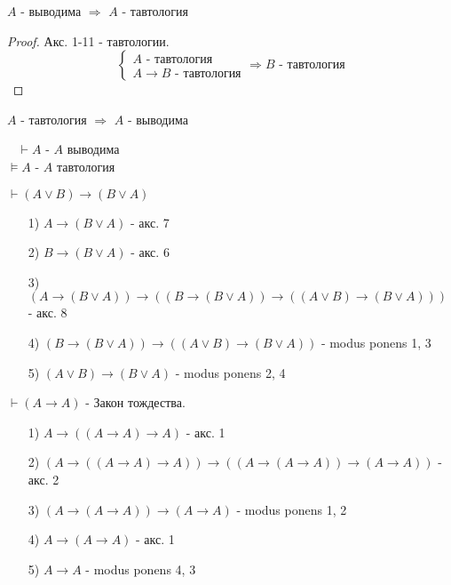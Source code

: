 \begin{theorem}[О корректности]
  $A$ - выводима $\Rightarrow$ $A$ - тавтология
\end{theorem}
\begin{proof}
  Акс. 1-11 - тавтологии. 
  \[
  \begin{cases}
  A \text{ - тавтология } \\
  A \rightarrow B \text{ - тавтология}
  \end{cases} \Rightarrow B \text{ - тавтология}
  \]
\end{proof}
\begin{theorem}[О полноте]
$A$ - тавтология $\Rightarrow$ $A$ - выводима
\end{theorem}
\begin{symb}
  ~\newline
  $\vdash A$ - $A$ выводима \\
  $\models A$ - $A$ тавтология
\end{symb}
\begin{example}
$\vdash (A \lor B) \rightarrow (B \lor A)$
\begin{itemize}
  \item [1) ] $A \rightarrow (B \lor A)$ - акс. 7
  \item [2) ] $B \rightarrow (B \lor A)$ - акс. 6
  \item [3) ] $(A \rightarrow (B \lor A)) \rightarrow ((B \rightarrow (B \lor A)) \rightarrow ((A \lor B) \rightarrow (B \lor A)))$ - акс. 8
  \item [4) ] $(B \rightarrow (B \lor A)) \rightarrow ((A \lor B) \rightarrow (B \lor A))$ - modus ponens 1, 3
  \item [5) ] $(A \lor B) \rightarrow (B \lor A)$ - modus ponens 2, 4
\end{itemize}
\end{example}
\begin{example}
$\vdash (A \rightarrow A)$ - Закон тождества.
\begin{itemize}
  \item [1) ] $A \rightarrow ((A \rightarrow A) \rightarrow A)$ - акс. 1
  \item [2) ] $(A \rightarrow ((A \rightarrow A) \rightarrow A)) \rightarrow ((A \rightarrow (A \rightarrow A)) \rightarrow (A \rightarrow A))$ - акс. 2
  \item [3) ] $(A \rightarrow (A \rightarrow A)) \rightarrow (A \rightarrow A)$ - modus ponens 1, 2
  \item [4) ] $A \rightarrow (A \rightarrow A)$ - акс. 1
  \item [5) ] $A \rightarrow A$ - modus ponens 4, 3
\end{itemize}
\end{example}

